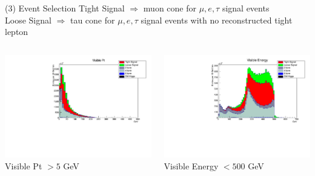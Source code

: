 \documentclass[10pt]{beamer}
\begin{document}
\begin{frame}{(3) Event Selection}
\scriptsize
Tight Signal $\Rightarrow$  muon cone for $\mu,e,\tau$ signal events\\
Loose Signal $\Rightarrow$  tau cone for $\mu,e,\tau$ signal events with no reconstructed tight lepton\\
\begin{columns}
\begin{column}{0.5\textwidth}
\includegraphics[scale=0.3, left]{PtvisHist.pdf} \\
Visible Pt $> 5$ GeV
\end{column}
\begin{column}{0.5\textwidth}
\includegraphics[scale=0.3, left]{EvisHist.pdf} \\
Visible Energy $< 500$ GeV
\end{column}
\end{columns}
\end{frame}
\end{document}
